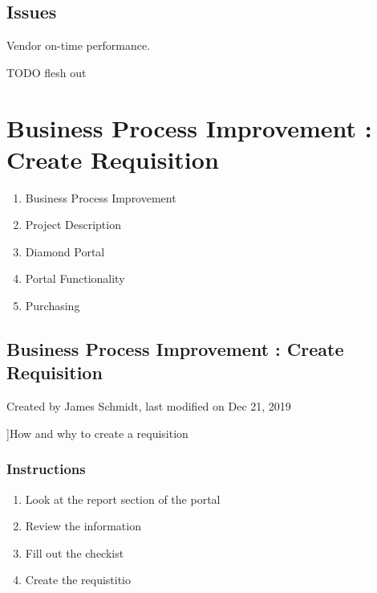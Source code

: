 \documentclass[letterpaper,10pt,english]{sphinxmanual}
\begin{document}
\section{Issues}
\label{Portal/450-MultipleLeadTimes2:issues}
Vendor on-time performance.

TODO flesh out


\chapter{Business Process Improvement : Create Requisition}
\label{Portal/700-Create-Requisition:business-process-improvement-create-requisition}\label{Portal/700-Create-Requisition::doc}\begin{enumerate}
\item {} 
Business Process Improvement

\item {} 
Project Description

\item {} 
Diamond Portal

\item {} 
Portal Functionality

\item {} 
Purchasing

\end{enumerate}


\section{Business Process Improvement : Create Requisition}
\label{Portal/700-Create-Requisition:id1}
Created by James Schmidt, last modified on Dec 21, 2019

{]}How and why to create a requisition


\subsection{Instructions}
\label{Portal/700-Create-Requisition:instructions}\begin{enumerate}
\item {} 
Look at the report section of the portal

\item {} 
Review the information

\item {} 
Fill out the checkist

\item {} 
Create the requistitio

\end{enumerate}
\end{document}
